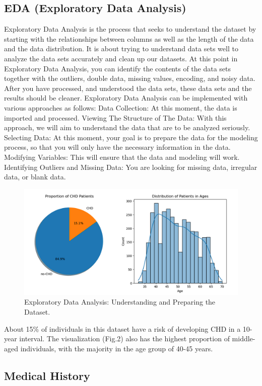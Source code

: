 \documentclass[conference]{IEEEtran}
\begin{document}
\subsection{EDA (Exploratory Data Analysis)}
Exploratory Data Analysis is the process that seeks to understand the dataset by starting with the relationships between columns as well as the length of the data and the data distribution. It is about trying to understand data sets well to analyze the data sets accurately and clean up our datasets. At this point in Exploratory Data Analysis, you can identify the contents of the data sets together with the outliers, double data, missing values, encoding, and noisy data. After you have processed, and understood the data sets, these data sets and the results should be cleaner. Exploratory Data Analysis can be implemented with various approaches as follows:
Data Collection: At this moment, the data is imported and processed. 
Viewing The Structure of The Data: With this approach, we will aim to understand the data that are to be analyzed seriously.
Selecting Data: At this moment, your goal is to prepare the data for the modeling process, so that you will only have the necessary information in the data.
Modifying Variables: This will ensure that the data and modeling will work.
Identifying Outliers and Missing Data: You are looking for missing data, irregular data, or blank data.

\begin{figure}[H]
    \centerline{\includegraphics[width=0.7\linewidth]{fig2.png}}
    \caption{Exploratory Data Analysis: Understanding and Preparing the Dataset.}
    \label{fig2}
\end{figure}


About 15\% of individuals in this dataset have a risk of developing CHD in a 10-year interval. The visualization (Fig.2) also has the highest proportion of middle-aged individuals, with the majority in the age group of 40-45 years.

\subsection{Medical History}
\end{document}
